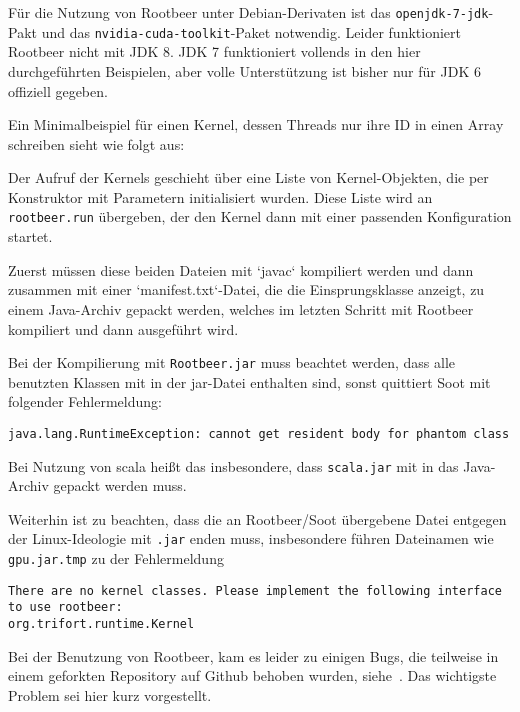 Für die Nutzung von Rootbeer unter Debian-Derivaten ist das \texttt{openjdk-7-jdk}-Pakt und das \texttt{nvidia-cuda-toolkit}-Paket notwendig. Leider funktioniert Rootbeer nicht mit JDK 8. JDK 7 funktioniert vollends in den hier durchgeführten Beispielen, aber volle Unterstützung ist bisher nur für JDK 6 offiziell gegeben\cite{rootbeerjdk6}.

Ein Minimalbeispiel für einen Kernel, dessen Threads nur ihre ID in einen Array schreiben sieht wie folgt aus:

Der Aufruf der Kernels geschieht über eine Liste von Kernel-Objekten, die per Konstruktor mit Parametern initialisiert wurden. Diese Liste wird an \texttt{rootbeer.run} übergeben, der den Kernel dann mit einer passenden Konfiguration startet.

Zuerst müssen diese beiden Dateien mit `javac` kompiliert werden und dann zusammen mit einer `manifest.txt`-Datei, die die Einsprungsklasse anzeigt, zu einem Java-Archiv gepackt werden, welches im letzten Schritt mit Rootbeer kompiliert und dann ausgeführt wird.

Bei der Kompilierung mit \texttt{Rootbeer.jar} muss beachtet werden, dass alle benutzten Klassen mit in der jar-Datei enthalten sind, sonst quittiert Soot mit folgender Fehlermeldung:
\begin{lstlisting}
java.lang.RuntimeException: cannot get resident body for phantom class
\end{lstlisting}\vspace{-1.5\baselineskip}
Bei Nutzung von scala heißt das insbesondere, dass \texttt{scala.jar} mit in das Java-Archiv gepackt werden muss.

Weiterhin ist zu beachten, dass die an Rootbeer/Soot übergebene Datei entgegen der Linux-Ideologie mit \texttt{.jar} enden muss, insbesondere führen Dateinamen wie \texttt{gpu.jar.tmp} zu der Fehlermeldung
\begin{lstlisting}
There are no kernel classes. Please implement the following interface to use rootbeer:
org.trifort.runtime.Kernel
\end{lstlisting}



Bei der Benutzung von Rootbeer, kam es leider zu einigen Bugs, die teilweise in einem geforkten Repository auf Github behoben wurden, siehe~\cite{ownrootbeerfork}.
Das wichtigste Problem sei hier kurz vorgestellt.

